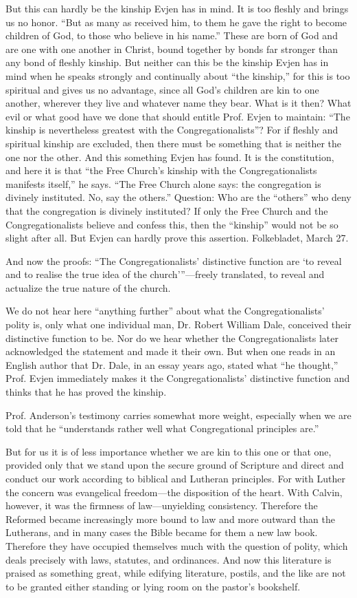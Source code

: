 But this can hardly be the kinship Evjen has in mind. It is too fleshly and brings us no honor. “But as many as received him, to them he gave the right to become children of God, to those who believe in his name.” These are born of God and are one with one another in Christ, bound together by bonds far stronger than any bond of fleshly kinship. But neither can this be the kinship Evjen has in mind when he speaks strongly and continually about “the kinship,” for this is too spiritual and gives us no advantage, since all God’s children are kin to one another, wherever they live and whatever name they bear. What is it then? What evil or what good have we done that should entitle Prof. Evjen to maintain: “The kinship is nevertheless greatest with the Congregationalists”? For if fleshly and spiritual kinship are excluded, then there must be something that is neither the one nor the other. And this something Evjen has found. It is the constitution, and here it is that “the Free Church’s kinship with the Congregationalists manifests itself,” he says. “The Free Church alone says: the congregation is divinely instituted. No, say the others.” Question: Who are the “others” who deny that the congregation is divinely instituted? If only the Free Church and the Congregationalists believe and confess this, then the “kinship” would not be so slight after all. But Evjen can hardly prove this assertion. Folkebladet, March 27.

And now the proofs: “The Congregationalists’ distinctive function are ‘to reveal and to realise the true idea of the church’”—freely translated, to reveal and actualize the true nature of the church.

We do not hear here “anything further” about what the Congregationalists’ polity is, only what one individual man, Dr. Robert William Dale, conceived their distinctive function to be. Nor do we hear whether the Congregationalists later acknowledged the statement and made it their own. But when one reads in an English author that Dr. Dale, in an essay years ago, stated what “he thought,” Prof. Evjen immediately makes it the Congregationalists’ distinctive function and thinks that he has proved the kinship.

Prof. Anderson’s testimony carries somewhat more weight, especially when we are told that he “understands rather well what Congregational principles are.”

But for us it is of less importance whether we are kin to this one or that one, provided only that we stand upon the secure ground of Scripture and direct and conduct our work according to biblical and Lutheran principles. For with Luther the concern was evangelical freedom—the disposition of the heart. With Calvin, however, it was the firmness of law—unyielding consistency. Therefore the Reformed became increasingly more bound to law and more outward than the Lutherans, and in many cases the Bible became for them a new law book. Therefore they have occupied themselves much with the question of polity, which deals precisely with laws, statutes, and ordinances. And now this literature is praised as something great, while edifying literature, postils, and the like are not to be granted either standing or lying room on the pastor’s bookshelf.

